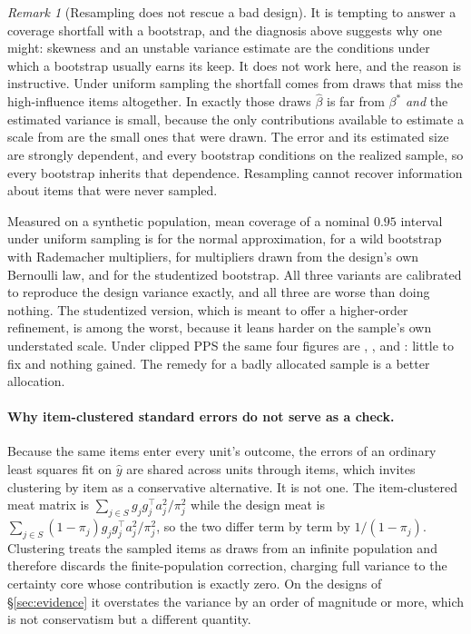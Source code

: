 \documentclass[11pt]{article}
\theoremstyle{plain}
\theoremstyle{remark}
\newtheorem{remark}[proposition]{Remark}
\begin{document}
\begin{remark}[Resampling does not rescue a bad design]
\label{rem:bootstrap}
It is tempting to answer a coverage shortfall with a bootstrap, and the
diagnosis above suggests why one might: skewness and an unstable variance
estimate are the conditions under which a bootstrap usually earns its keep. It
does not work here, and the reason is instructive. Under uniform sampling the
shortfall comes from draws that miss the high-influence items altogether. In
exactly those draws $\widehat\beta$ is far from $\beta^*$ \emph{and} the
estimated variance is small, because the only contributions available to
estimate a scale from are the small ones that were drawn. The error and its
estimated size are strongly dependent, and every bootstrap conditions on the
realized sample, so every bootstrap inherits that dependence. Resampling cannot
recover information about items that were never sampled.

Measured on a synthetic population, mean coverage of a nominal $0.95$ interval
under uniform sampling is \CovSrsNormal{} for the normal approximation,
\CovSrsRademacher{} for a wild bootstrap with Rademacher multipliers,
\CovSrsDesign{} for multipliers drawn from the design's own Bernoulli law, and
\CovSrsStudentized{} for the studentized bootstrap. All three variants are
calibrated to reproduce the design variance exactly, and all three are worse
than doing nothing. The studentized version, which is meant to offer a
higher-order refinement, is among the worst, because it leans harder on the
sample's own understated scale. Under clipped PPS the same four figures are
\CovPpsNormal{}, \CovPpsRademacher{}, \CovPpsDesign{} and
\CovPpsStudentized{}: little to fix and nothing gained. The remedy for a badly
allocated sample is a better allocation.
\end{remark}

\paragraph{Why item-clustered standard errors do not serve as a check.} Because the same items enter every unit's outcome, the errors of an ordinary least squares fit on $\widehat y$ are shared across units through items, which invites clustering by item as a conservative alternative. It is not one. The item-clustered meat matrix is $\sum_{j\in S}g_jg_j^\top a_j^2/\pi_j^2$ while the design meat is $\sum_{j\in S}(1-\pi_j)g_jg_j^\top a_j^2/\pi_j^2$, so the two differ term by term by $1/(1-\pi_j)$. Clustering treats the sampled items as draws from an infinite population and therefore discards the finite-population correction, charging full variance to the certainty core whose contribution is exactly zero. On the designs of \S\ref{sec:evidence} it overstates the variance by an order of magnitude or more, which is not conservatism but a different quantity.
\end{document}
